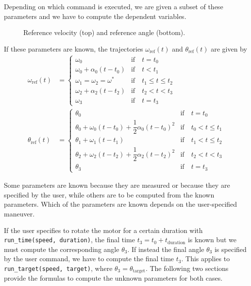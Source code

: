 \documentclass[12pt, a4paper]
{article}
\providecommand{\sub}[1]{_{\text{#1}}}
\providecommand{\w}{\omega}
\providecommand{\wt}{\w^*}
\providecommand{\wref}{\w\sub{ref}}
\renewcommand{\th}{\theta}
\providecommand{\thref}{\th\sub{ref}}
\renewcommand{\a}{\alpha}
\begin{document}
Depending on which command is executed, we are given a subset of these
parameters and we have to compute the dependent variables.


\begin{figure}[H]
    \centering
    
    \caption{
        Reference velocity (top) and reference angle (bottom).
        \label{fig:plots}}
\end{figure}


If these parameters are known, the trajectories $\wref(t)$ and $\thref(t)$ are
given by
%
\begin{align}
    \label{eq:wref}
    \wref(t)&=
    \begin{cases}
    \w_0 & \text{if} \quad t = t_0\\ 
    \w_0 + \a_0(t-t_0) & \text{if} \quad t < t_1\\
    \w_1=\w_2=\wt  & \text{if} \quad t_1 \leq t \leq t_2\\
    \w_2 + \a_2(t-t_2) & \text{if}\quad t_2 < t < t_3\\
    \w_3 & \text{if} \quad t = t_3
    \end{cases}\\[1em]
    \label{eq:thref}
    \thref(t)&=
    \begin{cases}
        \th_0 & \text{if} \quad t = t_0\\
        \th_0 + \w_0(t-t_0) + \dfrac{1}{2}\a_0(t-t_0)^2 &
            \text{if} \quad t_0 < t \leq t_1\\
        \th_1 + \w_1(t-t_1)  & \text{if} \quad t_1 < t \leq t_2\\
        \th_2 +\w_2(t-t_2)+\dfrac{1}{2}\a_2(t-t_2)^2 &
            \text{if}\quad t_2 < t < t_3\\
        \th_3 & \text{if} \quad t = t_3
    \end{cases}
\end{align}

Some parameters are known because they are measured or because they are
specified by the user, while others are to be computed from the known
parameters. Which of the parameters are known depends on the user-specified
maneuver.

If the user specifies to rotate the motor for a certain duration with
\texttt{run\_time(speed, duration)}, the final time $t_3=t_0+t\sub{duration}$
is known but we must compute the corresponding angle $\th_3$. If instead the
final angle $\th_3$ is specified by the user command, we have to compute the
final time $t_3$. This applies to \texttt{run\_target(speed, target)}, where
$\th_3=\th\sub{target}$. The following two sections provide the formulas to
compute the unknown parameters for both cases.
\end{document}
